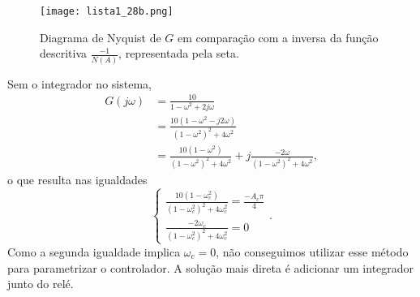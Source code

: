 \documentclass[a4paper]{report}
\begin{document}

\begin{figure}[H]
    \centering
    \texttt{[image: lista1\_28b.png]}
    \caption{Diagrama de Nyquist de $G$ em comparação com a inversa da função descritiva $\frac{-1}{N(A)}$, representada pela seta.}
    \label{fig:lista1_28b-png}
\end{figure}


Sem o integrador no sistema,
\begin{align*}
    G\left( j\omega \right) &= \frac{10}{1-\omega^2 +2j\omega} \\
    &= \frac{10\left( 1-\omega^2 -j2\omega \right) }{\left( 1-\omega^2 \right) ^2 +4\omega^2} \\
    &= \frac{10\left( 1-\omega^2 \right) }{\left( 1-\omega^2 \right) ^2 +4\omega^2} + j\frac{-2\omega}{\left( 1-\omega^2 \right) ^2 +4\omega^2}
,\end{align*}
o que resulta nas igualdades \[
\begin{cases}
    \frac{10\left( 1-\omega_c^2 \right) }{\left( 1-\omega_c^2 \right) ^2 +4\omega_c^2} = \frac{-A_c\pi}{4} \\
    \frac{-2\omega_c}{\left( 1-\omega_c^2 \right) ^2 +4\omega_c^2} = 0
\end{cases}
.\] Como a segunda igualdade implica $\omega_c = 0$, não conseguimos utilizar esse método para parametrizar o controlador. A solução mais direta é adicionar um integrador junto do relé.

\end{document}
